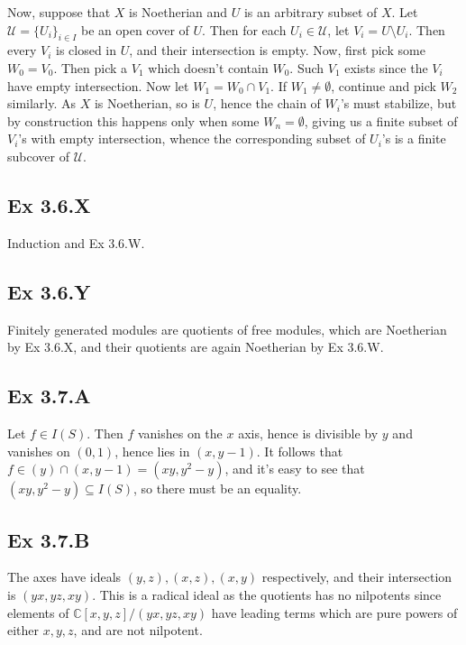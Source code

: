 \documentclass{article}
\theoremstyle{definition}
\newcommand{\C}{\mathbb{C}}
\begin{document}
Now, suppose that $X$ is Noetherian and $U$ is an arbitrary subset of $X$. Let
$\mathcal{U} = \{U_i\}_{i \in I}$ be an open cover of $U$. Then for each $U_i
\in \mathcal{U}$, let $V_i = U \setminus U_i$. Then every $V_i$ is closed in
$U$, and their intersection is empty. Now, first pick some $W_0 = V_0$. Then
pick a $V_1$ which doesn't contain $W_0$. Such $V_1$ exists since the $V_i$
have empty intersection. Now let $W_1 = W_0 \cap V_1$. If $W_1 \not =
\emptyset$, continue and pick $W_2$ similarly. As $X$ is Noetherian, so is $U$,
hence the chain of $W_i$'s must stabilize, but by construction this happens
only when some $W_n = \emptyset$, giving us a finite subset of $V_i$'s with
empty intersection, whence the corresponding subset of $U_i$'s is a finite
subcover of $\mathcal{U}$.


\subsection*{Ex 3.6.X}

Induction and Ex 3.6.W.

\subsection*{Ex 3.6.Y}

Finitely generated modules are quotients of free modules, which are Noetherian
by Ex 3.6.X, and their quotients are again Noetherian by Ex 3.6.W.

\subsection*{Ex 3.7.A}

Let $f \in I(S)$. Then $f$ vanishes on the $x$ axis, hence is divisible by $y$
and vanishes on $(0, 1)$, hence lies in $(x, y - 1)$. It follows that $f \in
(y) \cap (x, y-1) = (xy, y^2 - y)$, and it's easy to see that $(xy, y^2 - y)
\subseteq I(S)$, so there must be an equality.

\subsection*{Ex 3.7.B}

The axes have ideals $(y, z), (x, z), (x, y)$ respectively, and their
intersection is $(yx, yz, xy)$. This is a radical ideal as the quotients has no
nilpotents since elements of $\C[x, y, z]/(yx,yz,xy)$ have leading terms which
are pure powers of either $x, y, z$, and are not nilpotent.
\end{document}
